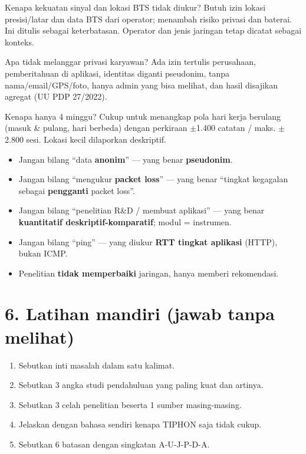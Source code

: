 \begin{tanya}{Kenapa kekuatan sinyal dan lokasi BTS tidak diukur?}
Butuh izin lokasi presisi/latar dan data BTS dari operator; menambah risiko privasi dan baterai. Ini ditulis sebagai keterbatasan. Operator dan jenis jaringan tetap dicatat sebagai konteks.
\end{tanya}
\begin{tanya}{Apa tidak melanggar privasi karyawan?}
Ada izin tertulis perusahaan, pemberitahuan di aplikasi, identitas diganti pseudonim, tanpa nama/email/GPS/foto, hanya admin yang bisa melihat, dan hasil disajikan agregat (UU PDP 27/2022).
\end{tanya}
\begin{tanya}{Kenapa hanya 4 minggu?}
Cukup untuk menangkap pola hari kerja berulang (masuk \& pulang, hari berbeda) dengan perkiraan $\pm$1.400 catatan / maks. $\pm$2.800 sesi. Lokasi kecil dilaporkan deskriptif.
\end{tanya}

\begin{awas}
\begin{itemize}
  \item Jangan bilang ``data \textbf{anonim}'' --- yang benar \textbf{pseudonim}.
  \item Jangan bilang ``mengukur \textbf{packet loss}'' --- yang benar ``tingkat kegagalan sebagai \textbf{pengganti} packet loss''.
  \item Jangan bilang ``penelitian R\&D / membuat aplikasi'' --- yang benar \textbf{kuantitatif deskriptif-komparatif}; modul = instrumen.
  \item Jangan bilang ``ping'' --- yang diukur \textbf{RTT tingkat aplikasi} (HTTP), bukan ICMP.
  \item Penelitian \textbf{tidak memperbaiki} jaringan, hanya memberi rekomendasi.
\end{itemize}
\end{awas}

\section*{6. Latihan mandiri (jawab tanpa melihat)}
\begin{enumerate}
  \item Sebutkan inti masalah dalam satu kalimat.
  \item Sebutkan 3 angka studi pendahuluan yang paling kuat dan artinya.
  \item Sebutkan 3 celah penelitian beserta 1 sumber masing-masing.
  \item Jelaskan dengan bahasa sendiri kenapa TIPHON saja tidak cukup.
  \item Sebutkan 6 batasan dengan singkatan A-U-J-P-D-A.
\end{enumerate}

